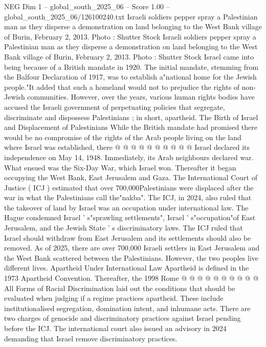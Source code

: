 \begin{textsample}{NEG Dim 1 – global\_south\_2025\_06 – Score 1.00 – global\_south\_2025\_06/126100240.txt}  \label{ex:f1_neg_245}
Israeli soldiers pepper spray a Palestinian man as they disperse a demonstration on land belonging to the West Bank village of Burin, February 2, 2013.
Photo : Shutter Stock Israeli soldiers pepper spray a Palestinian man as they disperse a demonstration on land belonging to the West Bank village of Burin, February 2, 2013.
Photo : Shutter Stock Israel came into being because of a British mandate in 1920.
The initial mandate, stemming from the Balfour Declaration of 1917, was to establish a"national home for the Jewish people."It added that such a homeland would not to prejudice the rights of non-Jewish communities.
However, over the years, various human rights bodies have accused the Israeli government of perpetuating policies that segregate, discriminate and dispossess Palestinians ; in short, apartheid.
The Birth of Israel and Displacement of Palestinians While the British mandate had promised there would be no compromise of the rights of the Arab people living on the land where Israel was established, there @ @ @ @ @ @ @ @ @ @ Israel declared its independence on May 14, 1948.
Immediately, its Arab neighbours declared war.
What ensued was the Six-Day War, which Israel won.
Thereafter it began occupying the West Bank, East Jerusalem and Gaza.
The International Court of Justice ( ICJ ) estimated that over 700,000Palestinians were displaced after the war in what the Palestinians call the"nakba".
The ICJ, in 2024, also ruled that the takeover of land by Israel was an occupation under international law.
The Hague condemned Israel ' s"sprawling settlements", Israel ' s"occupation"of East Jerusalem, and the Jewish State ' s discriminatory laws.
The ICJ ruled that Israel should withdraw from East Jerusalem and its settlements should also be removed.
As of 2025, there are over 700,000 Israeli settlers in East Jerusalem and the West Bank scattered between the Palestinians.
However, the two peoples live different lives.
Apartheid Under International Law Apartheid is defined in the 1973 Apartheid Convention.
Thereafter, the 1998 Rome @ @ @ @ @ @ @ @ @ @ All Forms of Racial Discrimination laid out the conditions that should be evaluated when judging if a regime practices apartheid.
These include institutionalised segregation, domination intent, and inhumane acts.
There are two charges of genocide and discriminatory practices against Israel pending before the ICJ.
The international court also issued an advisory in 2024 demanding that Israel remove discriminatory practices.

\end{textsample}
